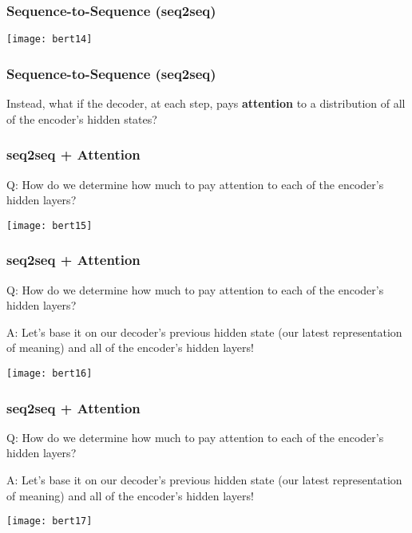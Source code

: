 \begin{frame}[fragile]\frametitle{Sequence-to-Sequence (seq2seq)}

\begin{center}
\texttt{[image: bert14]}
\end{center}	

\end{frame}

\begin{frame}[fragile]\frametitle{Sequence-to-Sequence (seq2seq)}

\begin{center}
Instead, what if the decoder, at each step, pays {\bf attention} to a distribution of all of the encoder’s hidden states?
\end{center}	

\end{frame}

\begin{frame}[fragile]\frametitle{seq2seq + Attention}

Q: How do we determine how much to pay attention to each of the encoder’s hidden layers? 

\begin{center}
\texttt{[image: bert15]}
\end{center}	

\end{frame}


\begin{frame}[fragile]\frametitle{seq2seq + Attention}

Q: How do we determine how much to pay attention to each of the encoder’s hidden layers? 

A: Let’s base it on our decoder’s previous hidden state (our latest representation of meaning) and all of the encoder’s hidden layers!


\begin{center}
\texttt{[image: bert16]}
\end{center}	

\end{frame}

\begin{frame}[fragile]\frametitle{seq2seq + Attention}

Q: How do we determine how much to pay attention to each of the encoder’s hidden layers? 

A: Let’s base it on our decoder’s previous hidden state (our latest representation of meaning) and all of the encoder’s hidden layers!


\begin{center}
\texttt{[image: bert17]}
\end{center}	

\end{frame}

